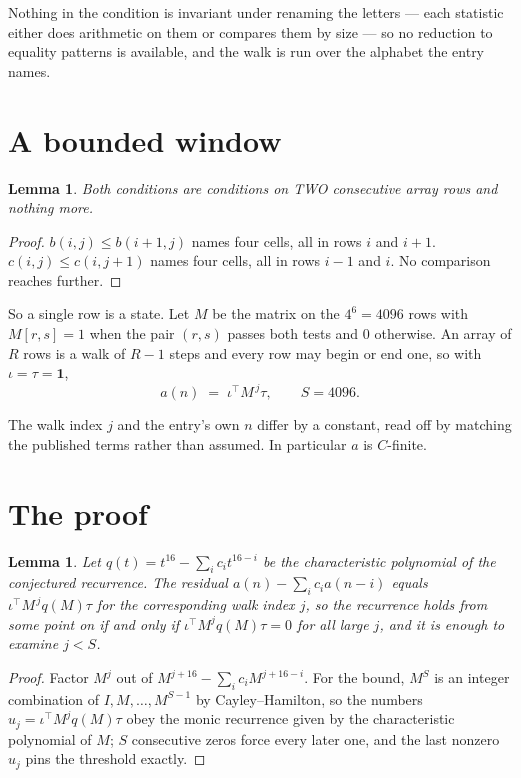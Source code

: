 \documentclass[11pt,a4paper]{article}
\theoremstyle{plain}
\newtheorem{lemma}[theorem]{Lemma}
\theoremstyle{definition}
\begin{document}
Nothing in the condition is invariant under renaming the letters --- each statistic either does
arithmetic on them or compares them by size --- so no reduction to equality patterns is
available, and the walk is run over the alphabet the entry names.

\section{A bounded window}

\begin{lemma}\label{lem:win}
Both conditions are conditions on TWO consecutive array rows and nothing more.
\end{lemma}

\begin{proof}
$b(i,j)\le b(i{+}1,j)$ names four cells, all in rows $i$ and $i+1$. $c(i,j)\le c(i,j{+}1)$
names four cells, all in rows $i-1$ and $i$. No comparison reaches further.
\end{proof}

So a single row is a state. Let $M$ be the matrix on the $4^{6}=4096$ rows with
$M[r,s]=1$ when the pair $(r,s)$ passes both tests and $0$ otherwise. An array of $R$ rows is a
walk of $R-1$ steps and every row may begin or end one, so with $\iota=\tau=\mathbf{1}$,
\[
a(n)\;=\;\iota^{\!\top}M^{\,j}\tau ,\qquad S=4096.
\]

The walk index $j$ and the entry's own $n$ differ by a constant, read off by matching the
published terms rather than assumed. In particular $a$ is $C$-finite.

\section{The proof}

\begin{lemma}\label{lem:crit}
Let $q(t)=t^{16}-\sum_i c_it^{16-i}$ be the characteristic polynomial of the
conjectured recurrence. The residual $a(n)-\sum_ic_ia(n-i)$ equals
$\iota^{\!\top}M^{\,j}q(M)\tau$ for the corresponding walk index $j$, so the recurrence
holds from some point on if and only if $\iota^{\!\top}M^{j}q(M)\tau=0$ for all large $j$,
and it is enough to examine $j<S$.
\end{lemma}

\begin{proof}
Factor $M^{j}$ out of $M^{j+16}-\sum_ic_iM^{j+16-i}$. For the bound, $M^{S}$
is an integer combination of $I,M,\dots,M^{S-1}$ by Cayley--Hamilton, so the numbers
$u_j=\iota^{\!\top}M^{j}q(M)\tau$ obey the monic recurrence given by the characteristic
polynomial of $M$; $S$ consecutive zeros force every later one, and the last nonzero $u_j$
pins the threshold exactly.
\end{proof}
\end{document}
